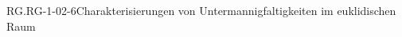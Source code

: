 \begin{PROP}{RG.RG-1-02-6}{Charakterisierungen von Untermannigfaltigkeiten im euklidischen Raum}

\end{PROP}
